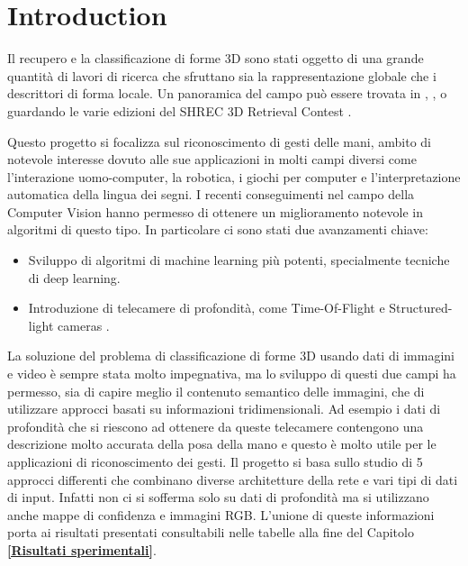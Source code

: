 \chapter{Introduction}
\label{introduction}

Il recupero e la classificazione di forme 3D sono stati oggetto di una grande quantità di lavori di ricerca che sfruttano sia la rappresentazione globale che i descrittori di forma locale. Un panoramica del campo può essere trovata in \cite{Tangelder2007}, \cite{YulanGuo2014}, \cite{BoYijuan} o guardando le varie edizioni del SHREC 3D Retrieval Contest \cite{ShrecContest}. 

Questo progetto si focalizza sul riconoscimento di gesti delle mani, ambito di notevole interesse dovuto alle sue applicazioni in molti campi diversi come l'interazione uomo-computer, la robotica, i giochi per computer e l'interpretazione automatica della lingua dei segni.
I recenti conseguimenti nel campo della Computer Vision hanno permesso di ottenere un miglioramento notevole in algoritmi di questo tipo. In particolare ci sono stati due avanzamenti chiave:

\begin{itemize}
\item Sviluppo di algoritmi di machine learning più potenti, specialmente tecniche di deep learning.
\item Introduzione di telecamere di profondità, come Time-Of-Flight e Structured-light cameras \cite{DalMutto2012}.
\end{itemize}

La soluzione del problema di classificazione di forme 3D usando dati di immagini e video è sempre stata molto impegnativa, ma lo sviluppo di questi due campi ha permesso, sia di capire meglio il contenuto semantico delle immagini, che di utilizzare approcci basati su informazioni tridimensionali. Ad esempio i dati di profondità che si riescono ad ottenere da queste telecamere contengono una descrizione molto accurata della posa della mano e questo è molto utile per le applicazioni di riconoscimento dei gesti.
Il progetto si basa sullo studio di 5 approcci differenti che combinano diverse architetture della rete e vari tipi di dati di input. Infatti non ci si sofferma solo su dati di profondità ma si utilizzano anche mappe di confidenza e immagini RGB. L'unione di queste informazioni porta ai risultati presentati consultabili nelle tabelle alla fine del Capitolo \textbf{\ref{Risultati sperimentali}}.\\

